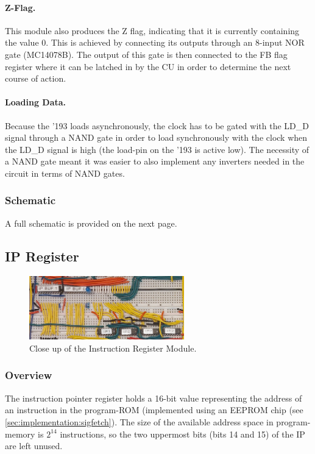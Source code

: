 \paragraph{Z-Flag.} This module also produces the Z flag, indicating that it is currently containing the value 0. This is achieved by connecting its outputs through an 8-input NOR gate (MC14078B). The output of this gate is then connected to the FB flag register where it can be latched in by the CU in order to determine the next course of action.

\paragraph{Loading Data.} Because the '193 loads asynchronously, the clock has to be gated with the LD\_D signal through a NAND gate in order to load synchronously with the clock when the LD\_D signal is high (the load-pin on the '193 is active low). The necessity of a NAND gate meant it was easier to also implement any inverters needed in the circuit in terms of NAND gates.


\subsubsection{Schematic}
A full schematic is provided on the next page.



\subsection{IP Register}
\begin{figure}[H]
  \centering
  \includegraphics[width=0.6\textwidth]{img/ipregistercloseup}
  \caption{Close up of the Instruction Register Module.}
  \label{fig:iregcloseup}
\end{figure}

\subsubsection{Overview}
The instruction pointer register holds a 16-bit value representing the address of an instruction in the program-ROM (implemented using an EEPROM chip (see \ref{sec:implementation:sigfetch}). The size of the available address space in program-memory is $2^{14}$ instructions, so the two uppermost bits (bits 14 and 15) of the IP are left unused.

